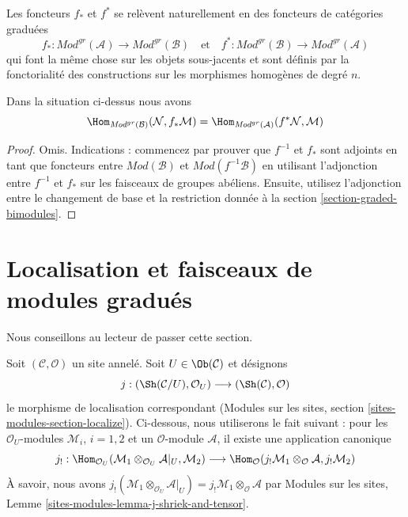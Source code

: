 \medskip\noindent
Les foncteurs $f_*$ et $f^*$ se relèvent naturellement en des foncteurs de catégories graduées
$$
f_* :
\textit{Mod}^{gr}(\mathcal{A})
\longrightarrow
\textit{Mod}^{gr}(\mathcal{B})
\quad\text{et}\quad
f^* :
\textit{Mod}^{gr}(\mathcal{B})
\longrightarrow
\textit{Mod}^{gr}(\mathcal{A})
$$
qui font la même chose sur les objets sous-jacents et sont définis par la fonctorialité des constructions sur les morphismes homogènes de degré $n$.

\begin{lemma}
\label{lemma-adjunction-push-pull-gr}
Dans la situation ci-dessus nous avons
$$
\Hom_{\textit{Mod}^{gr}(\mathcal{B})}(
\mathcal{N}, f_*\mathcal{M}) =
\Hom_{\textit{Mod}^{gr}(\mathcal{A})}(
f^*\mathcal{N}, \mathcal{M})
$$
\end{lemma}

\begin{proof}
Omis.
Indications : commencez par prouver que $f^{-1}$ et $f_*$ sont adjoints en tant que foncteurs entre $\textit{Mod}(\mathcal{B})$ et $\textit{Mod}(f^{-1}\mathcal{B})$ en utilisant l'adjonction entre $f^{-1}$ et $f_*$ sur les faisceaux de groupes abéliens.
Ensuite, utilisez l'adjonction entre le changement de base et la restriction donnée à la section \ref{section-graded-bimodules}.
\end{proof}





\section{Localisation et faisceaux de modules gradués}
\label{section-localize-graded}

\noindent
Nous conseillons au lecteur de passer cette section.

\medskip\noindent
Soit $(\mathcal{C}, \mathcal{O})$ un site annelé.
Soit $U \in \Ob(\mathcal{C})$ et désignons
$$
j :
(\Sh(\mathcal{C}/U), \mathcal{O}_U)
\longrightarrow
(\Sh(\mathcal{C}), \mathcal{O})
$$
le morphisme de localisation correspondant (Modules sur les sites, section \ref{sites-modules-section-localize}).
Ci-dessous, nous utiliserons le fait suivant : pour les $\mathcal{O}_U$-modules $\mathcal{M}_i$, $i = 1, 2$ et un $\mathcal{O}$-module $\mathcal{A}$, il existe une application canonique
$$
j_! :
\Hom_{\mathcal{O}_U}(
\mathcal{M}_1 \otimes_{\mathcal{O}_U} \mathcal{A}|_U, \mathcal{M}_2)
\longrightarrow
\Hom_\mathcal{O}(
j_!\mathcal{M}_1 \otimes_\mathcal{O} \mathcal{A}, j_!\mathcal{M}_2)
$$
À savoir, nous avons $j_!(\mathcal{M}_1 \otimes_{\mathcal{O}_U} \mathcal{A}|_U) = j_!\mathcal{M}_1 \otimes_\mathcal{O} \mathcal{A}$ par Modules sur les sites, Lemme \ref{sites-modules-lemma-j-shriek-and-tensor}.

